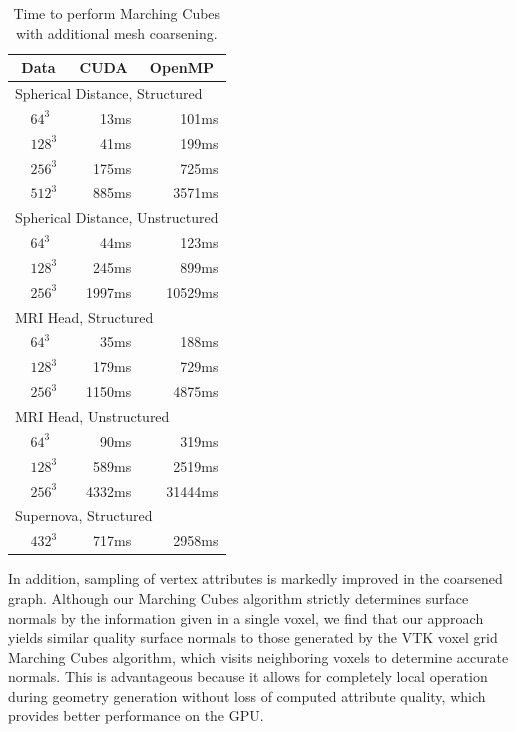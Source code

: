 \documentclass[10pt,journal,cspaper,compsoc]{IEEEtran}
\begin{document}
\begin{table}[htb]
  \centering
  \caption{Time to perform Marching Cubes with additional mesh coarsening.}
  \label{table:Coarsening}
  \begin{tabular}{l l r r}
    \multicolumn{2}{c}{Data}
    & \multicolumn{1}{c}{CUDA}
    & \multicolumn{1}{c}{OpenMP} \\
    \hline
    \multicolumn{4}{l}{Spherical Distance, Structured} \\
    \quad
    & $64^3$  &  13ms & 101ms \\
    & $128^3$ &  41ms & 199ms \\
    & $256^3$ & 175ms & 725ms \\
    & $512^3$ & 885ms &3571ms \\
    \multicolumn{4}{l}{Spherical Distance, Unstructured} \\
    & $64^3$  &  44ms &  123ms \\
    & $128^3$ & 245ms &  899ms \\
    & $256^3$ &1997ms &10529ms \\
    \multicolumn{4}{l}{MRI Head, Structured} \\
    & $64^3$  &  35ms & 188ms \\
    & $128^3$ & 179ms & 729ms \\
    & $256^3$ &1150ms &4875ms \\
    \multicolumn{4}{l}{MRI Head, Unstructured} \\
    & $64^3$  &   90ms &  319ms \\
    & $128^3$ &  589ms & 2519ms \\
    & $256^3$ & 4332ms &31444ms \\
    \multicolumn{4}{l}{Supernova, Structured} \\
    & $432^3$ &  717ms & 2958ms   
    
  \end{tabular}
\end{table}

In addition, sampling of vertex attributes is markedly improved in the
coarsened graph. Although our Marching Cubes algorithm strictly determines
surface normals by the information given in a single voxel, we find that
our approach yields similar quality surface normals to those generated by
the VTK voxel grid Marching Cubes algorithm, which visits neighboring
voxels to determine accurate normals. This is advantageous because it
allows for completely local operation during geometry generation without
loss of computed attribute quality, which provides better performance on
the GPU.
\end{document}
